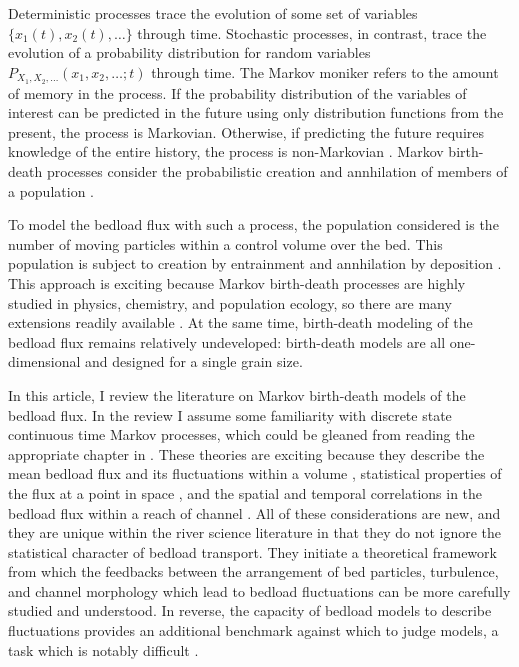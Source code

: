 Deterministic processes trace the evolution of some set of variables $\{x_1(t),x_2(t),\dots\}$ through time. 
Stochastic processes, in contrast, trace the evolution of a probability distribution for random variables $P_{X_1,X_2,\dots}(x_1,x_2,\dots;t)$ through time. 
The Markov moniker refers to the amount of memory in the process.
If the probability distribution of the variables of interest can be predicted in the future using only distribution functions from the present, the process is Markovian. 
Otherwise, if predicting the future requires knowledge of the entire history, the process is non-Markovian \citep{Cox1965, VanKampen1992}. 
Markov birth-death processes consider the probabilistic creation and annhilation of members of a population \citep{Cox1965, VanKampen1992}.  

To model the bedload flux with such a process, the population considered is the number of moving particles within a control volume over the bed. 
This population is subject to creation by entrainment and annhilation by deposition \citep{Ancey2008, Turowski2009, Heyman2013, Ma2014,  Ancey2014a, Ancey2015}. 
This approach is exciting because Markov birth-death processes are highly studied in physics, chemistry, and population ecology, so there are many extensions readily available \citep{Bailey1968, Cox1965, Pielou1977, VandenBroek2012, VanKampen1992, Gillespie1992, Field2010, Mendez2015}. 
At the same time, birth-death modeling of the bedload flux remains relatively undeveloped: birth-death models are all one-dimensional and designed for a single grain size. 

In this article, I review the literature on Markov birth-death models of the bedload flux.
In the review I assume some familiarity with discrete state continuous time Markov processes, which could be gleaned from reading the appropriate chapter in \citet{Cox1965}. 
These theories are exciting because they describe the mean bedload flux and its fluctuations within a volume \citep{Ancey2006, Ancey2008, Turowski2009}, statistical properties of the flux at a point in space \citep{Heyman2013, Ma2014}, and the spatial and temporal correlations in the bedload flux within a reach of channel \citep{Ancey2014, Ancey2015}. 
All of these considerations are new, and they are unique within the river science literature in that they do not ignore the statistical character of bedload transport. 
They initiate a theoretical framework from which the feedbacks between the arrangement of bed particles, turbulence, and channel morphology which lead to bedload fluctuations can be more carefully studied and understood. 
In reverse, the capacity of bedload models to describe fluctuations provides an additional benchmark against which to judge models, a task which is notably difficult \citep{Iverson2013}. 

